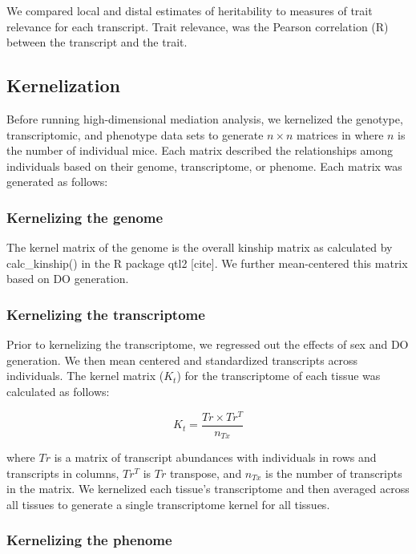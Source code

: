 \documentclass[
]{article}
\begin{document}
We compared local and distal estimates of heritability to measures of
trait relevance for each transcript. Trait relevance, was the Pearson
correlation (R) between the transcript and the trait.

\subsection{Kernelization}\label{kernelization}

Before running high-dimensional mediation analysis, we kernelized the
genotype, transcriptomic, and phenotype data sets to generate
\(n \times n\) matrices in where \(n\) is the number of individual mice.
Each matrix described the relationships among individuals based on their
genome, transcriptome, or phenome. Each matrix was generated as follows:

\subsubsection{Kernelizing the genome}\label{kernelizing-the-genome}

The kernel matrix of the genome is the overall kinship matrix as
calculated by calc\_kinship() in the R package qtl2 {[}cite{]}. We
further mean-centered this matrix based on DO generation.

\subsubsection{Kernelizing the
transcriptome}\label{kernelizing-the-transcriptome}

Prior to kernelizing the transcriptome, we regressed out the effects of
sex and DO generation. We then mean centered and standardized
transcripts across individuals. The kernel matrix (\(K_t\)) for the
transcriptome of each tissue was calculated as follows:

\begin{equation*}
K_t = \frac{Tr \times Tr^T}{n_{Tx}}
\end{equation*}

where \(Tr\) is a matrix of transcript abundances with individuals in
rows and transcripts in columns, \(Tr^T\) is \(Tr\) transpose, and
\(n_{Tx}\) is the number of transcripts in the matrix. We kernelized
each tissue's transcriptome and then averaged across all tissues to
generate a single transcriptome kernel for all tissues.

\subsubsection{Kernelizing the phenome}\label{kernelizing-the-phenome}
\end{document}
